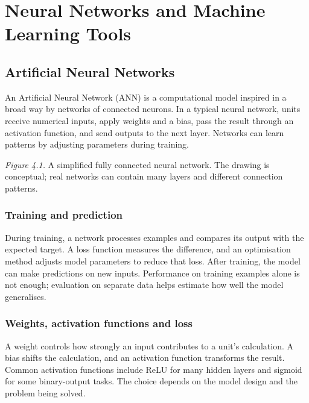 \documentclass[11pt,openany,oneside]{book}
\begin{document}
\chapter{Neural Networks and Machine Learning Tools}
\section{Artificial Neural Networks}
An Artificial Neural Network (ANN) is a computational model inspired in a broad way by networks of connected neurons. In a typical neural network, units receive numerical inputs, apply weights and a bias, pass the result through an activation function, and send outputs to the next layer. Networks can learn patterns by adjusting parameters during training.

\begin{center}
\end{center}
\textit{Figure 4.1.} A simplified fully connected neural network. The drawing is conceptual; real networks can contain many layers and different connection patterns.

\subsection{Training and prediction}
During training, a network processes examples and compares its output with the expected target. A loss function measures the difference, and an optimisation method adjusts model parameters to reduce that loss. After training, the model can make predictions on new inputs. Performance on training examples alone is not enough; evaluation on separate data helps estimate how well the model generalises.

\subsection{Weights, activation functions and loss}
A weight controls how strongly an input contributes to a unit's calculation. A bias shifts the calculation, and an activation function transforms the result. Common activation functions include ReLU for many hidden layers and sigmoid for some binary-output tasks. The choice depends on the model design and the problem being solved.
\end{document}
